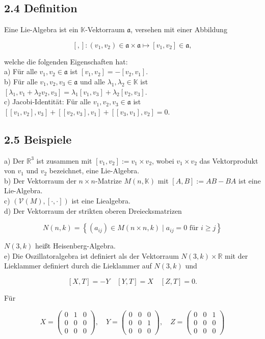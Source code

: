 \documentclass[10pt, letterpaper]{article}
\begin{document}
\subsection*{2.4 Definition}
Eine Lie-Algebra ist ein $\mathbb{K}$-Vektorraum $\mathfrak{a}$, versehen mit einer Abbildung

$$
[,]:\left(v_{1}, v_{2}\right) \in \mathfrak{a} \times \mathfrak{a} \mapsto\left[v_{1}, v_{2}\right] \in \mathfrak{a},
$$

welche die folgenden Eigenschaften hat:\\
a) Für alle $v_{1}, v_{2} \in \mathfrak{a}$ ist $\left[v_{1}, v_{2}\right]=-\left[v_{2}, v_{1}\right]$.\\
b) Für alle $v_{1}, v_{2}, v_{3} \in \mathfrak{a}$ und alle $\lambda_{1}, \lambda_{2} \in \mathbb{K}$ ist $\left[\lambda_{1}, v_{1}+\lambda_{2} v_{2}, v_{3}\right]=\lambda_{1}\left[v_{1}, v_{3}\right]+\lambda_{2}\left[v_{2}, v_{3}\right]$.\\
c) Jacobi-Identität: Für alle $v_{1}, v_{2}, v_{3} \in \mathfrak{a}$ ist $\left[\left[v_{1}, v_{2}\right], v_{3}\right]+\left[\left[v_{2}, v_{3}\right], v_{1}\right]+\left[\left[v_{3}, v_{1}\right], v_{2}\right]=0$.

\subsection*{2.5 Beispiele}
a) Der $\mathbb{R}^{3}$ ist zusammen mit $\left[v_{1}, v_{2}\right]:=v_{1} \times v_{2}$, wobei $v_{1} \times v_{2}$ das Vektorprodukt von $v_{1}$ und $v_{2}$ bezeichnet, eine Lie-Algebra.\\
b) Der Vektorraum der $n \times n$-Matrize $M(n, \mathbb{K})$ mit $[A, B]:=A B-B A$ ist eine Lie-Algebra.\\
c) $(\mathcal{V}(M),[\cdot, \cdot])$ ist eine Liealgebra.\\
d) Der Vektorraum der strikten oberen Dreiecksmatrizen

$$
N(n, k)=\left\{\left(a_{i j}\right) \in M(n \times n, k) \mid a_{i j}=0 \text { für } i \geq j\right\}
$$

$N(3, k)$ heißt Heisenberg-Algebra.\\
e) Die Oszillatoralgebra ist definiert als der Vektorraum $N(3, k) \times \mathbb{R}$ mit der Lieklammer definiert durch die Lieklammer auf $N(3, k)$ und

$$
[X, T]=-Y \quad[Y, T]=X \quad[Z, T]=0 .
$$

Für

$$
X=\left(\begin{array}{lll}
0 & 1 & 0 \\
0 & 0 & 0 \\
0 & 0 & 0
\end{array}\right), \quad Y=\left(\begin{array}{lll}
0 & 0 & 0 \\
0 & 0 & 1 \\
0 & 0 & 0
\end{array}\right), \quad Z=\left(\begin{array}{lll}
0 & 0 & 1 \\
0 & 0 & 0 \\
0 & 0 & 0
\end{array}\right)
$$
\end{document}
